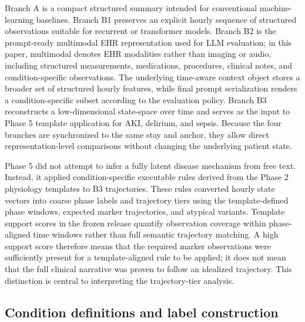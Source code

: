 \documentclass[pdflatex,sn-nature]{sn-jnl}
\begin{document}
Branch A is a compact structured summary intended for conventional machine-learning baselines. Branch B1 preserves an explicit hourly sequence of structured observations suitable for recurrent or transformer models. Branch B2 is the prompt-ready multimodal EHR representation used for LLM evaluation; in this paper, multimodal denotes EHR modalities rather than imaging or audio, including structured measurements, medications, procedures, clinical notes, and condition-specific observations. The underlying time-aware context object stores a broader set of structured hourly features, while final prompt serialization renders a condition-specific subset according to the evaluation policy. Branch B3 reconstructs a low-dimensional state-space over time and serves as the input to Phase 5 template application for AKI, delirium, and sepsis. Because the four branches are synchronized to the same stay and anchor, they allow direct representation-level comparisons without changing the underlying patient state.

Phase 5 did not attempt to infer a fully latent disease mechanism from free text. Instead, it applied condition-specific executable rules derived from the Phase 2 physiology templates to B3 trajectories. These rules converted hourly state vectors into coarse phase labels and trajectory tiers using the template-defined phase windows, expected marker trajectories, and atypical variants. Template support scores in the frozen release quantify observation coverage within phase-aligned time windows rather than full semantic trajectory matching. A high support score therefore means that the required marker observations were sufficiently present for a template-aligned rule to be applied; it does not mean that the full clinical narrative was proven to follow an idealized trajectory. This distinction is central to interpreting the trajectory-tier analysis.

\subsection{Condition definitions and label construction}
\end{document}
